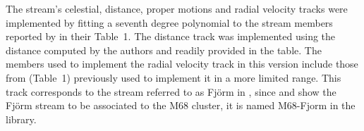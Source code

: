 The stream's celestial, distance, proper motions and radial velocity tracks were implemented by fitting a seventh degree polynomial to the stream members reported by \citet{Ibata2021} in their Table~1. The distance track was implemented using the distance computed by the authors and readily provided in the table. 
The members used to implement the radial velocity track in this version include those from \citet{Ibata2019} (Table~1) previously used to implement it in a more limited range.
This track corresponds to the stream referred to as Fj\"orm in \citet{Ibata2019,Ibata2021}, since \citet{Ibata2021} and \citet{Palau2019} show the Fj\"orm stream to be associated to the M68 cluster, it is named M68-Fjorm in the library.
